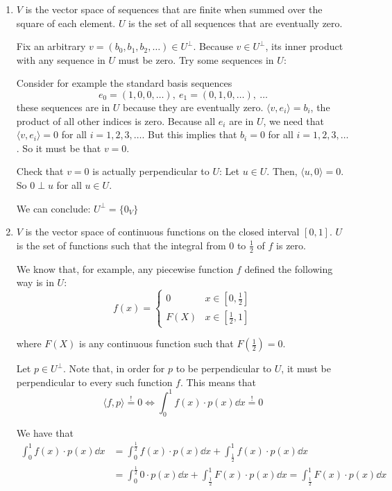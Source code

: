 \documentclass[12pt]{article}
\begin{document}
\begin{enumerate}[label=\alph*)]
    \item $V$ is the vector space of sequences that are finite when summed over the square of each element. $U$ is the set of all sequences that are eventually zero.
    
    Fix an arbitrary $v = (b_0, b_1, b_2, \dots) \in U^\perp$. Because $v \in U^\perp$, its inner product with any sequence in $U$ must be zero. Try some sequences in $U$:

    Consider for example the standard basis sequences 
    $$
        e_0 = (1, 0, 0, \dots),\ e_1 = (0, 1, 0, \dots),\ \dots
    $$
    these sequences are in $U$ because they are eventually zero. $\langle v, e_i \rangle = b_i$, the product of all other indices is zero. Because all $e_i$ are in $U$, we need that $\langle v, e_i \rangle = 0$ for all $i = 1,2,3,\dots$. But this implies that $b_i = 0$ for all $i=1,2,3,\dots$. So it must be that $v = 0$.

    Check that $v = 0$ is actually perpendicular to $U$: Let $u \in U$. Then, $\langle u, 0 \rangle = 0$. So $0 \perp u$ for all $u \in U$.

    We can conclude: $U^\perp = \{0_V\}$

    \item $V$ is the vector space of continuous functions on the closed interval $[0, 1]$. $U$ is the set of functions such that the integral from $0$ to $\frac{1}{2}$ of $f$ is zero.
    
    We know that, for example, any piecewise function $f$ defined the following way is in $U$:
    $$
        f(x) = \begin{cases}
            0 & x \in [0, \frac{1}{2}] \\
            F(X) & x \in [\frac{1}{2}, 1]
        \end{cases}
    $$

    where $F(X)$ is any continuous function such that $F(\frac{1}{2}) = 0$.

    Let $p \in U^\perp$. Note that, in order for $p$ to be perpendicular to $U$, it must be perpendicular to every such function $f$. This means that
    $$
        \langle f, p \rangle \overset{!}= 0 \iff \int_0^1 f(x) \cdot p(x) \dd x \overset{!}= 0
    $$

    We have that
    $$
    \begin{aligned}
        \int_0^1 f(x) \cdot p(x) \dd x &= \int_{0}^{\frac{1}{2}} f(x) \cdot p(x) \dd x + \int_{\frac{1}{2}}^1 f(x) \cdot p(x) \dd x \\
        &= \int_{0}^{\frac{1}{2}} 0 \cdot p(x) \dd x + \int_{\frac{1}{2}}^1 F(x) \cdot p(x) \dd x = \int_{\frac{1}{2}}^1 F(x) \cdot p(x) \dd x
    \end{aligned}
    $$


\end{enumerate}
\end{document}

